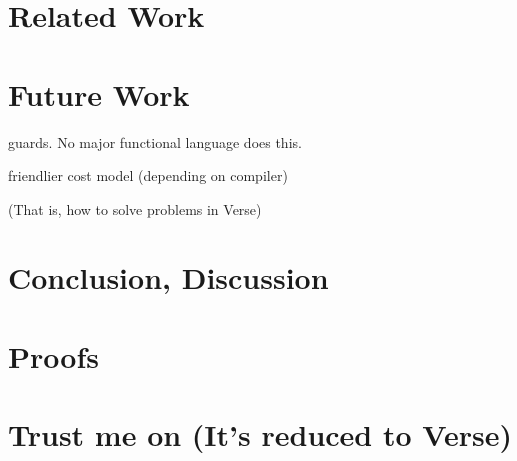 \documentclass[manuscript,screen,review, 12pt]{acmart}
\begin{document}
    
    
    
    


\section{Related Work}
\section{Future Work}

    
    
    
        guards. No major functional language does this. 
    
    friendlier cost model (depending on compiler)
    
        (That is, how to solve problems in Verse)
    


\section{Conclusion, Discussion}

\renewcommand\thesection{\Alph{section}}
\setcounter{section}{0}
\section{Proofs}

    
    
    


\section{Trust me on \VMinus (It's reduced to Verse)}

    
    
    
    
\end{document}
